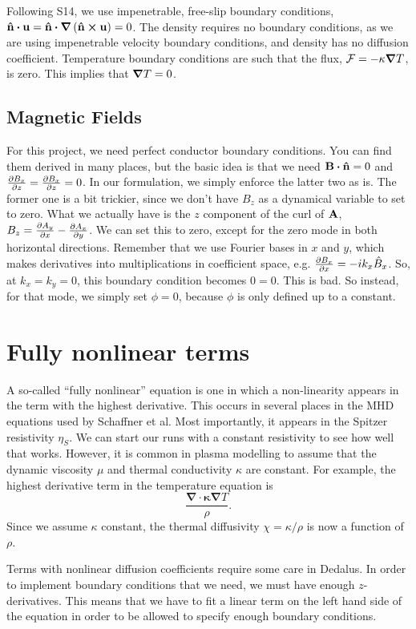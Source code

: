 \documentclass{jpp}
\newcommand{\vnorm}{\vb{\hat{n}}}
\begin{document}
Following S14, we use impenetrable, free-slip boundary conditions, $\vnorm \vdot \vb{u} = \vnorm \vdot \grad{\left(\vnorm \cross \vb{u}\right)} = 0$. The density requires no boundary conditions, as we are using impenetrable velocity boundary conditions, and density has no diffusion coefficient. Temperature boundary conditions are such that the flux, $\mathcal{F} = -\kappa \grad{T}$, is zero. This implies that $\grad{T} = 0$.


\subsection{Magnetic Fields}
\label{sec:B_bc}

For this project, we need perfect conductor boundary conditions. You can find them derived in many places, but the basic idea is that we need $\vb{B} \vdot \vnorm = 0$ and $\pdv{B_x}{z} = \pdv{B_x}{z} = 0$. In our formulation, we simply enforce the latter two as is. The former one is a bit trickier, since we don't have $B_z$ as a dynamical variable to set to zero. What we actually have is the $z$ component of the curl of $\vb{A}$, $B_z = \pdv{A_y}{x} - \pdv{A_x}{y}$. We can set this to zero, except for the zero mode in both horizontal directions. Remember that we use Fourier bases in $x$ and $y$, which makes derivatives into multiplications in coefficient space, e.g. $\pdv{B_x}{x} = -i k_x \hat{B}_x$. So, at $k_x = k_y = 0$, this boundary condition becomes $0 = 0$. This is bad. So instead, for that mode, we simply set $\phi = 0$, because $\phi$ is only defined up to a constant.


\section{Fully nonlinear terms}
\label{sec:fully_nonlinear} 

A so-called ``fully nonlinear'' equation is one in which a non-linearity appears in the term with the highest derivative. This occurs in several places in the MHD equations used by Schaffner et al. Most importantly, it appears in the Spitzer resistivity $\eta_S$. We can start our runs with a constant resistivity to see how well that works. However, it is common in plasma modelling to assume that the dynamic viscosity $\mu$ and thermal conductivity $\kappa$ are constant. For example, the highest derivative term in the temperature equation is
\begin{equation}
  \label{eq:heat_diff}
 \frac{\mathbf{\nabla \cdot \kappa \nabla} T}{\rho}.
\end{equation}
Since we assume $\kappa$ constant, the thermal diffusivity $\chi = \kappa/\rho$ is now a function of $\rho$. 


Terms with nonlinear diffusion coefficients require some care in Dedalus. In order to implement boundary conditions that we need, we must have enough $z$-derivatives. This means that we have to fit a linear term on the left hand side of the equation in order to be allowed to specify enough boundary conditions.




\end{document}
